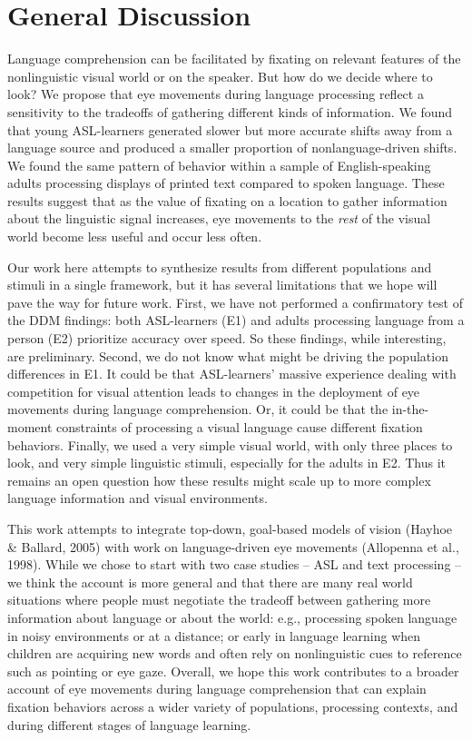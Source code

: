 \documentclass[10pt, letterpaper]{article}
\begin{document}
\section{General Discussion}\label{general-discussion}

Language comprehension can be facilitated by fixating on relevant
features of the nonlinguistic visual world or on the speaker. But how do
we decide where to look? We propose that eye movements during language
processing reflect a sensitivity to the tradeoffs of gathering different
kinds of information. We found that young ASL-learners generated slower
but more accurate shifts away from a language source and produced a
smaller proportion of nonlanguage-driven shifts. We found the same
pattern of behavior within a sample of English-speaking adults
processing displays of printed text compared to spoken language. These
results suggest that as the value of fixating on a location to gather
information about the linguistic signal increases, eye movements to the
\emph{rest} of the visual world become less useful and occur less often.

Our work here attempts to synthesize results from different populations
and stimuli in a single framework, but it has several limitations that
we hope will pave the way for future work. First, we have not performed
a confirmatory test of the DDM findings: both ASL-learners (E1) and
adults processing language from a person (E2) prioritize accuracy over
speed. So these findings, while interesting, are preliminary. Second, we
do not know what might be driving the population differences in E1. It
could be that ASL-learners' massive experience dealing with competition
for visual attention leads to changes in the deployment of eye movements
during language comprehension. Or, it could be that the in-the-moment
constraints of processing a visual language cause different fixation
behaviors. Finally, we used a very simple visual world, with only three
places to look, and very simple linguistic stimuli, especially for the
adults in E2. Thus it remains an open question how these results might
scale up to more complex language information and visual environments.

This work attempts to integrate top-down, goal-based models of vision
(Hayhoe \& Ballard, 2005) with work on language-driven eye movements
(Allopenna et al., 1998). While we chose to start with two case studies
-- ASL and text processing -- we think the account is more general and
that there are many real world situations where people must negotiate
the tradeoff between gathering more information about language or about
the world: e.g., processing spoken language in noisy environments or at
a distance; or early in language learning when children are acquiring
new words and often rely on nonlinguistic cues to reference such as
pointing or eye gaze. Overall, we hope this work contributes to a
broader account of eye movements during language comprehension that can
explain fixation behaviors across a wider variety of populations,
processing contexts, and during different stages of language learning.
\end{document}
